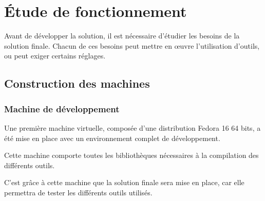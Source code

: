 \cleardoublepage



\chapter{Étude de fonctionnement}

Avant de développer la solution, il est nécessaire d'étudier les besoins de la solution finale.
Chacun de ces besoins peut mettre en œuvre l'utilisation d'outils, ou peut exiger certains réglages.
\\






\section{Construction des machines}
\label{Construction des machines}


\subsection{Machine de développement}

Une première machine virtuelle, composée d'une distribution Fedora 16 64 bits, a été mise en place avec un environnement complet de développement.

Cette machine comporte toutes les bibliothèques nécessaires à la compilation des différents outils.

C'est grâce à cette machine que la solution finale sera mise en place, car elle permettra de tester les différents outils utilisés.
\\




